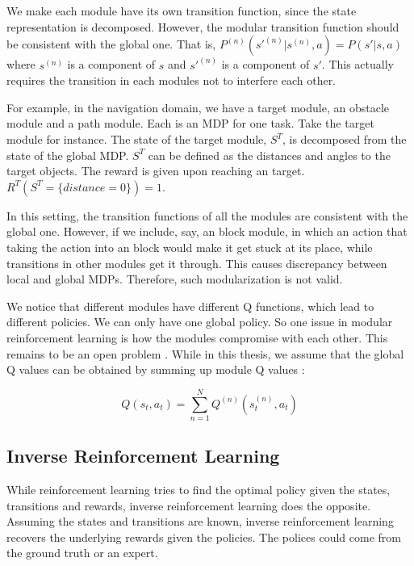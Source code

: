 \documentclass[12pt]{report}	%
\theoremstyle{definition}
\theoremstyle{remark}
\begin{document}
We make each module have its own transition function, since the state representation is
decomposed. However, the modular transition function should be consistent with
the global one. That is, $P^{(n)}(s'^{(n)} | s^{(n)}, a) = P(s'|s, a)$ where
$s^{(n)}$ is a component of $s$ and $s'^{(n)}$ is a component of $s'$. This
actually requires the transition in each modules not to interfere each other.

For example, in the navigation domain, we have a target module, an obstacle
module and a path module. Each is an MDP for one task. Take the target
module for instance. The state of the target module, $S^T$, is decomposed from
the state of the global MDP. $S^T$ can be defined as the distances and angles to
the target objects. The reward is given upon reaching an target.
$R^T(S^T=\{distance=0\}) = 1$.

In this setting, the transition functions of all the modules are consistent with
the global one. However, if we include, say, an block module, in which an action that
taking the action into an block would make it get stuck at its place, while
transitions in other modules get it through. This causes discrepancy between
local and global MDPs. Therefore, such modularization is not valid.

We notice that different modules have different Q functions, which lead to
different policies. We can only have one global policy. So one issue in modular
reinforcement learning is how the modules compromise with each other. This
remains to be an open problem \cite{zhang2014action}. While in this thesis, we
assume that the global Q values can be obtained by summing up module Q values
\cite{russell2003q,sprague2003multiple}:

\begin{equation}
\label{sumQ1}
Q(s_t,a_t) = \sum_{n=1}^{N} Q^{(n)}(s_t^{(n)},a_t)
\end{equation}

\subsection{Inverse Reinforcement Learning}

While reinforcement learning tries to find the optimal policy given the states,
transitions and rewards, inverse reinforcement learning does the opposite.
Assuming the states and transitions are known, inverse reinforcement learning
recovers the underlying rewards given the policies. The polices could come from
the ground truth or an expert.
\end{document}
